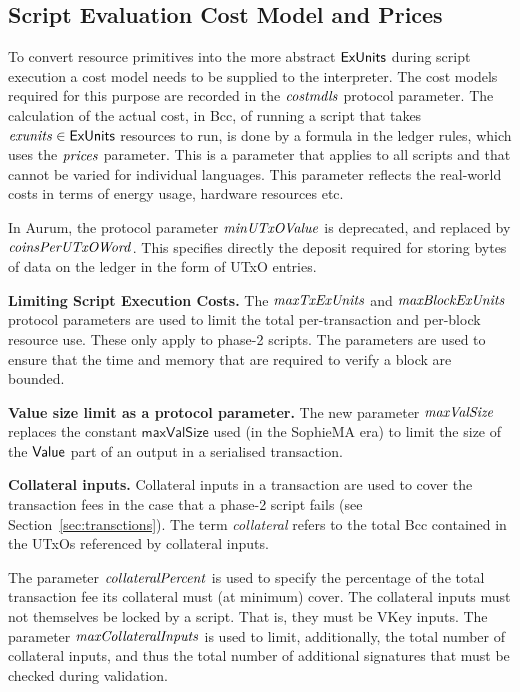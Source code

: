 \subsection{Script Evaluation Cost Model and Prices}
\label{sec:cost-mod}

To convert resource primitives into the
more abstract $\mathsf{ExUnits}$ during script execution a cost model needs to be supplied to the interpreter.
The cost models required for this purpose are recorded in the $\mathit{costmdls}$ protocol parameter.
%
The calculation of the actual cost, in Bcc, of running
a script that takes $\mathit{exunits} \in \mathsf{ExUnits}$ resources to run,
is done by a formula in the ledger rules, which uses the
$\mathit{prices}$ parameter. This is a parameter that applies to all
scripts and that cannot be varied for individual languages. This parameter
reflects the real-world costs in terms of energy usage, hardware resources etc.

In Aurum, the protocol parameter $\mathit{minUTxOValue}$ is deprecated, and replaced by
$\mathit{coinsPerUTxOWord}$. This specifies directly the deposit required for storing
bytes of data on the ledger in the form of UTxO entries.

\textbf{Limiting Script Execution Costs.}
The $\mathit{maxTxExUnits}$ and $\mathit{maxBlockExUnits}$ protocol parameters are
used to limit the total per-transaction and per-block resource use. These only apply to phase-2 scripts.
The parameters are used to ensure that the time and memory that are required to verify a block are bounded.

\textbf{Value size limit as a protocol parameter.}
The new parameter $\mathit{maxValSize}$ replaces the constant $\mathsf{maxValSize}$
used (in the SophieMA era) to limit the size of the $\mathsf{Value}$ part of an output in a
serialised transaction.

\textbf{Collateral inputs.}
Collateral inputs in a transaction are used to cover the transaction fees in the case
that a phase-2 script fails (see Section~\ref{sec:transctions}).
The term \emph{collateral} refers to the total Bcc contained in the UTxOs referenced
by collateral inputs.

The parameter $\mathit{collateralPercent}$ is used to specify the percentage of
the total transaction fee its collateral must (at minimum) cover. The
collateral inputs must not themselves be locked by a script. That is, they must
be VKey inputs. The parameter $\mathit{maxCollateralInputs}$ is used to limit, additionally,
the total number of collateral inputs, and thus the total number of additional
signatures that must be checked during validation.

